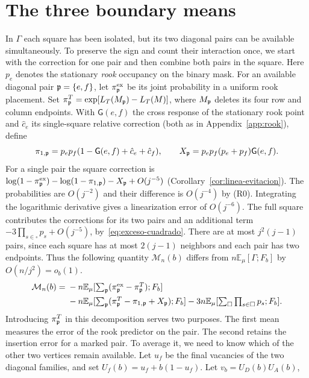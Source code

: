 \section{The three boundary means}\label{app:boundary} In \(\Gamma\) each square has been isolated, but
its two diagonal pairs can be available simultaneously. To preserve the sign and count their interaction
once, we start with the correction for one pair and then combine both pairs in the square. Here \(p_e\)
denotes the stationary \emph{rook} occupancy on the binary mask. For an available diagonal pair
\(\mathfrak p=\{e,f\}\), let \(\pi^{\rm ex}_{\mathfrak p}\) be its joint probability in a uniform rook placement.
Set \(\pi^T_{\mathfrak p}=\exp[L_T(M_{\mathfrak p})-L_T(M)]\), where \(M_{\mathfrak p}\) deletes its four row and
column endpoints. With \(\mathsf G(e,f)\) the cross response of the stationary rook point and \(\hat
c_e\) its single-square
relative correction (both as in Appendix~\ref{app:rook}), define \[
 \pi_{1,\mathfrak p}=p_ep_f(1-\mathsf G(e,f)+\hat c_e+\hat c_f),\qquad
 X_{\mathfrak p}=p_ep_f(p_e+p_f)\mathsf G(e,f).
\] For a single pair the square correction is \(\log(1-\pi^{\rm
ex}_{\mathfrak p})-\log(1-\pi_{1,\mathfrak p})-X_{\mathfrak p}+O(j^{-5})\) (Corollary~\ref{cor:linea-evitacion}). The
probabilities are \(O(j^{-2})\) and their difference is \(O(j^{-4})\) by (R0). Integrating the
logarithmic derivative gives a linearization error of
\(O(j^{-6})\). The full square contributes the corrections for its two pairs and an additional term
\(-3\prod_{s\in\square}p_s+O(j^{-5})\), by~\eqref{eq:exceso-cuadrado}. There are at most \(j^2(j-1)\)
pairs, since each square has at
most \(2(j-1)\) neighbors and each pair has two endpoints. Thus the following quantity \(\mathcal
M_n(b)\) differs from \(n\mathbb
 E_\mu[\Gamma;F_b]\) by \(O(n/j^2)=o_b(1)\). \begin{align*}
 \mathcal M_n(b)={}&-n\mathbb E_\mu[\textstyle\sum_{\mathfrak p}(\pi^{\rm ex}_{\mathfrak p}-\pi^T_{\mathfrak p});F_b]\\
           &-n\mathbb E_\mu[\textstyle\sum_{\mathfrak p}(\pi^T_{\mathfrak p}-\pi_{1,\mathfrak p}+X_{\mathfrak p});F_b]
            -3n\mathbb E_\mu[\textstyle\sum_\square\prod_{s\in\square}p_s;F_b].
\end{align*} Introducing \(\pi^T_{\mathfrak p}\) in this decomposition serves two purposes. The first mean
measures the error of the rook predictor on the pair. The second retains the insertion error for a marked
pair. To average it, we need to know which of the other two vertices remain available. Let \(u_f\) be the
final vacancies of the two diagonal families, and set \(U_f(b)=u_f+b(1-u_f)\). Let \(v_b=U_D(b)U_A(b)\),

